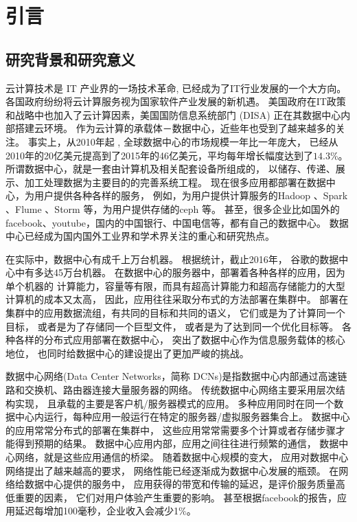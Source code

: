 \chapter{引言}
\label{cha:intro}

\section{研究背景和研究意义}

云计算技术是 IT 产业界的一场技术革命, 已经成为了IT行业发展的一个大方向。 
各国政府纷纷将云计算服务视为国家软件产业发展的新机遇。 
美国政府在IT政策和战略中也加入了云计算因素，美国国防信息系统部门 (DISA) 正在其数据中心内部搭建云环境\cite{fang-cloud}。
作为云计算的承载体－数据中心，近些年也受到了越来越多的关注。
事实上，从2010年起 , 全球数据中心的市场规模一年比一年庞大，
已经从2010年的20亿美元提高到了2015年的46亿美元，平均每年增长幅度达到了$14.3\%$\cite{wu-datacenter}。
所谓数据中心，就是一套由计算机及相关配套设备所组成的，
以储存、传递、展示、加工处理数据为主要目的的完善系统工程\cite{wu-datacenter}。
现在很多应用都部署在数据中心，为用户提供各种各样的服务，
例如，为用户提供计算服务的Hadoop \footnotemark[1]、Spark \footnotemark[2]、Flume \footnotemark[3]、Storm \footnotemark[4]等，为用户提供存储的ceph \footnotemark[5]等。
甚至，很多企业比如国外的facebook、youtube，国内的中国银行、中国电信等，都有自己的数据中心。
数据中心已经成为国内国外工业界和学术界关注的重心和研究热点。

在实际中，数据中心有成千上万台机器。
根据统计，截止2016年，
谷歌的数据中心中有多达45万台机器\cite{wei-dc}。
在数据中心的服务器中，部署着各种各样的应用，因为单个机器的
计算能力，容量等有限，而具有超高计算能力和超高存储能力的大型计算机的成本又太高，
因此，应用往往采取分布式的方法部署在集群中。
部署在集群中的应用数据流组，有共同的目标和共同的语义，
它们或是为了计算同一个目标，
或者是为了存储同一个巨型文件，
或者是为了达到同一个优化目标等。
各种各样的分布式应用部署在数据中心，
突出了数据中心作为信息服务载体的核心地位，
也同时给数据中心的建设提出了更加严峻的挑战。


数据中心网络(Data Center Networks，简称 DCNs)是指数据中心内部通过高速链路和交换机、路由器连接大量服务器的网络。
传统数据中心网络主要采用层次结构实现，
且承载的主要是客户机/服务器模式的应用。
多种应用同时在同一个数据中心内运行，每种应用一般运行在特定的服务器/虚拟服务器集合上\cite{wei-dc}。
数据中心的应用常常分布式的部署在集群中，
这些应用常常需要多个计算或者存储步骤才能得到预期的结果。
数据中心应用内部，应用之间往往进行频繁的通信，
数据中心网络，就是这些应用通信的桥梁。
随着数据中心规模的变大，
应用对数据中心网络提出了越来越高的要求，
网络性能已经逐渐成为数据中心发展的瓶颈。
在网络给数据中心提供的服务中，
应用获得的带宽和传输的延迟，是评价服务质量高低重要的因素，
它们对用户体验产生重要的影响。
甚至根据facebook的报告\cite{Latency}，应用延迟每增加100毫秒，企业收入会减少1$\%$。



